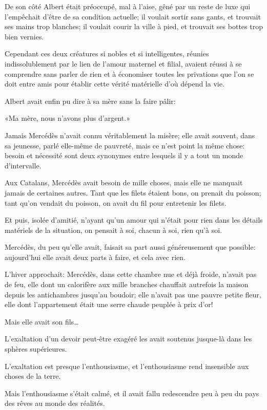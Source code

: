 De son côté Albert était préoccupé, mal à l'aise, gêné par un reste de luxe qui l'empêchait d'être de sa condition actuelle; il voulait sortir sans gants, et trouvait ses mains trop blanches; il voulait courir la ville à pied, et trouvait ses bottes trop bien vernies. 

Cependant ces deux créatures si nobles et si intelligentes, réunies indissolublement par le lien de l'amour maternel et filial, avaient réussi à se comprendre sans parler de rien et à économiser toutes les privations que l'on se doit entre amis pour établir cette vérité matérielle d'où dépend la vie. 

Albert avait enfin pu dire à sa mère sans la faire pâlir: 

«Ma mère, nous n'avons plus d'argent.» 

Jamais Mercédès n'avait connu véritablement la misère; elle avait souvent, dans sa jeunesse, parlé elle-même de pauvreté, mais ce n'est point la même chose: besoin et nécessité sont deux synonymes entre lesquels il y a tout un monde d'intervalle. 

Aux Catalans, Mercédès avait besoin de mille choses, mais elle ne manquait jamais de certaines autres. Tant que les filets étaient bons, on prenait du poisson; tant qu'on vendait du poisson, on avait du fil pour entretenir les filets. 

Et puis, isolée d'amitié, n'ayant qu'un amour qui n'était pour rien dans les détails matériels de la situation, on pensait à soi, chacun à soi, rien qu'à soi. 

Mercédès, du peu qu'elle avait, faisait sa part aussi généreusement que possible: aujourd'hui elle avait deux parts à faire, et cela avec rien. 

L'hiver approchait: Mercédès, dans cette chambre nue et déjà froide, n'avait pas de feu, elle dont un calorifère aux mille branches chauffait autrefois la maison depuis les antichambres jusqu'au boudoir; elle n'avait pas une pauvre petite fleur, elle dont l'appartement était une serre chaude peuplée à prix d'or! 

Mais elle avait son fils\dots 

L'exaltation d'un devoir peut-être exagéré les avait soutenus jusque-là dans les sphères supérieures. 

L'exaltation est presque l'enthousiasme, et l'enthousiasme rend insensible aux choses de la terre. 

Mais l'enthousiasme s'était calmé, et il avait fallu redescendre peu à peu du pays des rêves au monde des réalités. 

